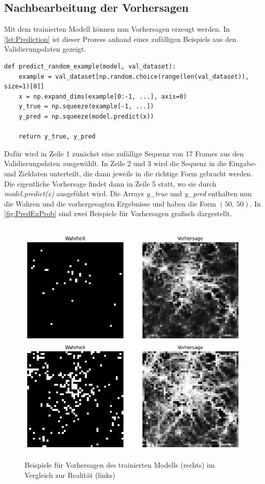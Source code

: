 \subsection{Nachbearbeitung der Vorhersagen}
\label{sec:Nachbearbeitung}
Mit dem trainierten Modell können nun Vorhersagen erzeugt werden.
In \autoref{lst:Prediction} ist dieser Prozess anhand eines zufälligen Beispiels aus den Validierungsdaten gezeigt.

\begin{code}
\begin{verbatim}
def predict_random_example(model, val_dataset):
    example = val_dataset[np.random.choice(range(len(val_dataset)), size=1)[0]]
    x = np.expand_dims(example[0:-1, ...], axis=0)
    y_true = np.squeeze(example[-1, ...])
    y_pred = np.squeeze(model.predict(x))

    return y_true, y_pred
\end{verbatim}
\label{lst:Prediction}
\end{code}

Dafür wird in Zeile 1 zunächst eine zufällige Sequenz von 17 Frames aus den Validierungsdaten ausgewählt.
In Zeile 2 und 3 wird die Sequenz in die Eingabe- und Zieldaten unterteilt, die dann jeweils in die richtige Form gebracht werden.
Die eigentliche Vorhersage findet dann in Zeile 5 statt, wo sie durch \emph{model.predict(x)} ausgeführt wird.
Die Arrays \emph{y\_true} und \emph{y\_pred} enthalten nun die Wahren und die vorhergesagten Ergebnisse und haben die Form $(50,~50)$.
In \autoref{fig:PredExProb} sind zwei Beispiele für Vorhersagen grafisch dargestellt.

\begin{figure}[h]
    \centering
    \includegraphics[width=1.0\textwidth,height=12cm,keepaspectratio=true]{content/images/PredExProb.png}
    \caption{Beispiele für Vorhersagen des trainierten Modells (rechts) im Vergleich zur Realität (links)}
    \label{fig:PredExProb}
\end{figure}

